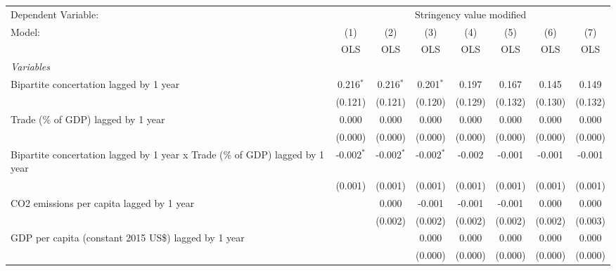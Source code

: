 
\begingroup
\centering
\begin{tabular}{lccccccc}
   \toprule
   Dependent Variable: & \multicolumn{7}{c}{Stringency value modified}\\
   Model:                                                                        & (1)          & (2)          & (3)          & (4)     & (5)     & (6)     & (7)\\  
                                                                                 &  OLS         & OLS          & OLS          & OLS     & OLS     & OLS     & OLS\\  
   \midrule
   \emph{Variables}\\
   Bipartite concertation lagged by 1 year                                       & 0.216$^{*}$  & 0.216$^{*}$  & 0.201$^{*}$  & 0.197   & 0.167   & 0.145   & 0.149\\   
                                                                                 & (0.121)      & (0.121)      & (0.120)      & (0.129) & (0.132) & (0.130) & (0.132)\\   
   Trade (\% of GDP) lagged by 1 year                                            & 0.000        & 0.000        & 0.000        & 0.000   & 0.000   & 0.000   & 0.000\\   
                                                                                 & (0.000)      & (0.000)      & (0.000)      & (0.000) & (0.000) & (0.000) & (0.000)\\   
   Bipartite concertation lagged by 1 year x Trade (\% of GDP) lagged by 1 year  & -0.002$^{*}$ & -0.002$^{*}$ & -0.002$^{*}$ & -0.002  & -0.001  & -0.001  & -0.001\\   
                                                                                 & (0.001)      & (0.001)      & (0.001)      & (0.001) & (0.001) & (0.001) & (0.001)\\   
   CO2 emissions per capita lagged by 1 year                                     &              & 0.000        & -0.001       & -0.001  & -0.001  & 0.000   & 0.000\\   
                                                                                 &              & (0.002)      & (0.002)      & (0.002) & (0.002) & (0.002) & (0.003)\\   
   GDP per capita (constant 2015 US\$) lagged by 1 year                          &              &              & 0.000        & 0.000   & 0.000   & 0.000   & 0.000\\   
                                                                                 &              &              & (0.000)      & (0.000) & (0.000) & (0.000) & (0.000)\\   

\end{tabular}
